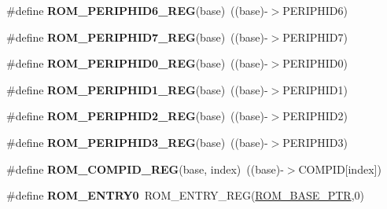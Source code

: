 \begin{DoxyCompactItemize}
\#define {\bfseries R\+O\+M\+\_\+\+P\+E\+R\+I\+P\+H\+I\+D6\+\_\+\+R\+EG}(base)~((base)-\/$>$P\+E\+R\+I\+P\+H\+I\+D6)
\item 
\mbox{\label{group___r_o_m___register___accessor___macros_ga00f0b786d839d625a7d166b7185a2205}} 
\#define {\bfseries R\+O\+M\+\_\+\+P\+E\+R\+I\+P\+H\+I\+D7\+\_\+\+R\+EG}(base)~((base)-\/$>$P\+E\+R\+I\+P\+H\+I\+D7)
\item 
\mbox{\label{group___r_o_m___register___accessor___macros_ga43347eab2982b34ff8b89e454ba08837}} 
\#define {\bfseries R\+O\+M\+\_\+\+P\+E\+R\+I\+P\+H\+I\+D0\+\_\+\+R\+EG}(base)~((base)-\/$>$P\+E\+R\+I\+P\+H\+I\+D0)
\item 
\mbox{\label{group___r_o_m___register___accessor___macros_ga293b3b6eaf2b3b39d7343b14e1845b4f}} 
\#define {\bfseries R\+O\+M\+\_\+\+P\+E\+R\+I\+P\+H\+I\+D1\+\_\+\+R\+EG}(base)~((base)-\/$>$P\+E\+R\+I\+P\+H\+I\+D1)
\item 
\mbox{\label{group___r_o_m___register___accessor___macros_gac1ebfc31a7ae53d67acd0a8fcc4594e9}} 
\#define {\bfseries R\+O\+M\+\_\+\+P\+E\+R\+I\+P\+H\+I\+D2\+\_\+\+R\+EG}(base)~((base)-\/$>$P\+E\+R\+I\+P\+H\+I\+D2)
\item 
\mbox{\label{group___r_o_m___register___accessor___macros_ga83d8e6b599e7f968e226687ad93282cc}} 
\#define {\bfseries R\+O\+M\+\_\+\+P\+E\+R\+I\+P\+H\+I\+D3\+\_\+\+R\+EG}(base)~((base)-\/$>$P\+E\+R\+I\+P\+H\+I\+D3)
\item 
\mbox{\label{group___r_o_m___register___accessor___macros_gadf3bba37f4d1e368614a96a068c8c6c1}} 
\#define {\bfseries R\+O\+M\+\_\+\+C\+O\+M\+P\+I\+D\+\_\+\+R\+EG}(base,  index)~((base)-\/$>$C\+O\+M\+P\+ID\mbox{[}index\mbox{]})
\item 
\mbox{\label{group___r_o_m___register___accessor___macros_gada69a41d0a902f6012e684efb7c9e3ad}} 
\#define {\bfseries R\+O\+M\+\_\+\+E\+N\+T\+R\+Y0}~R\+O\+M\+\_\+\+E\+N\+T\+R\+Y\+\_\+\+R\+EG(\hyperlink{group___r_o_m___peripheral_ga5ad426d10b6832ca7012e8767113f686}{R\+O\+M\+\_\+\+B\+A\+S\+E\+\_\+\+P\+TR},0)

\end{DoxyCompactItemize}
